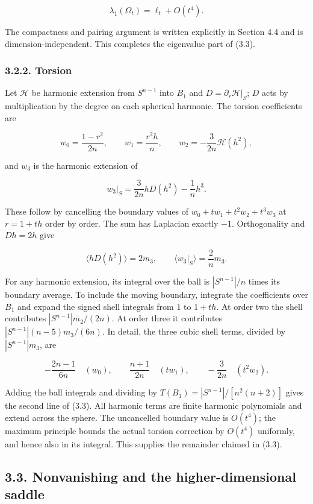\documentclass[11pt]{article}
\begin{document}
\[
\lambda_1(\Omega_t)=\ell_t+O(t^4).
\tag{3.17}
\]

The compactness and pairing argument is written explicitly in Section
4.4 and is dimension-independent. This completes the eigenvalue part of
(3.3).

\subsubsection{3.2.2. Torsion}\label{torsion}

Let \(\mathcal H\) be harmonic extension from \(S^{n-1}\) into \(B_1\)
and \(D=\partial_r\mathcal H|_S\); \(D\) acts by multiplication by the
degree on each spherical harmonic. The torsion coefficients are

\[
w_0=\frac{1-r^2}{2n},\qquad
w_1=\frac{r^2h}{n},\qquad
w_2=-\frac{3}{2n}\mathcal H(h^2),
\tag{3.18}
\]

and \(w_3\) is the harmonic extension of

\[
w_3|_S=\frac{3}{2n}hD(h^2)-\frac1n h^3.
\tag{3.19}
\]

These follow by cancelling the boundary values of
\(w_0+tw_1+t^2w_2+t^3w_3\) at \(r=1+th\) order by order. The sum has
Laplacian exactly \(-1\). Orthogonality and \(Dh=2h\) give

\[
\langle hD(h^2)\rangle=2m_3,
\qquad \langle w_3|_S\rangle=\frac2n m_3.
\tag{3.20}
\]

For any harmonic extension, its integral over the ball is
\(|S^{n-1}|/n\) times its boundary average. To include the moving
boundary, integrate the coefficients over \(B_1\) and expand the signed
shell integrals from \(1\) to \(1+th\). At order two the shell
contributes \(|S^{n-1}|m_2/(2n)\). At order three it contributes
\(|S^{n-1}|(n-5)m_3/(6n)\). In detail, the three cubic shell terms,
divided by \(|S^{n-1}|m_3\), are

\[
-\frac{2n-1}{6n}\quad(w_0),\qquad
\frac{n+1}{2n}\quad(tw_1),\qquad
-\frac3{2n}\quad(t^2w_2).
\tag{3.21}
\]

Adding the ball integrals and dividing by
\(T(B_1)=|S^{n-1}|/[n^2(n+2)]\) gives the second line of (3.3). All
harmonic terms are finite harmonic polynomials and extend across the
sphere. The uncancelled boundary value is \(O(t^4)\); the maximum
principle bounds the actual torsion correction by \(O(t^4)\) uniformly,
and hence also in its integral. This supplies the remainder claimed in
(3.3).

\subsection{3.3. Nonvanishing and the higher-dimensional
saddle}\label{nonvanishing-and-the-higher-dimensional-saddle}
\end{document}
